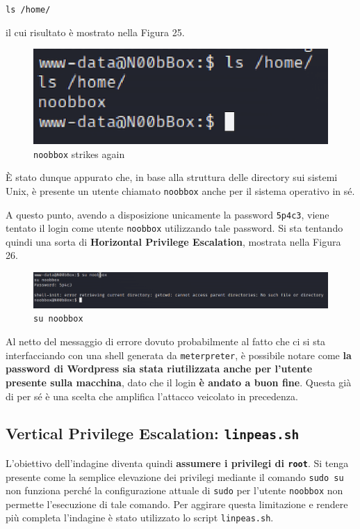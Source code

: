 \documentclass[a4paper, 12pt, oneside]{article}
\begin{document}
\begin{center}
    \texttt{ls /home/}
\end{center}

il cui risultato è mostrato nella Figura 25.

\begin{figure}[h!]
    \centering
    \includegraphics[width=\textwidth]{img/ls-home.png}
    \caption{\texttt{noobbox} strikes again}
\end{figure}

È stato dunque appurato che, in base alla struttura delle directory sui sistemi Unix, è presente un utente chiamato \texttt{noobbox} anche per il sistema operativo in sé.

A questo punto, avendo a disposizione unicamente la password \texttt{5p4c3}, viene tentato il login come utente \texttt{noobbox} utilizzando tale password. Si sta tentando quindi una sorta di \textbf{Horizontal Privilege Escalation}, mostrata nella Figura 26.

\begin{figure}[h!]
    \centering
    \includegraphics[width=\textwidth]{img/su-noobbox.png}
    \caption{\texttt{su noobbox}}
\end{figure}

\newpage
Al netto del messaggio di errore dovuto probabilmente al fatto che ci si sta interfacciando con una shell generata da \texttt{meterpreter}, è possibile notare come \textbf{la password di Wordpress sia stata riutilizzata anche per l'utente presente sulla macchina}, dato che il login \textbf{è andato a buon fine}. Questa già di per sé è una scelta che amplifica l'attacco veicolato in precedenza.

\subsection{Vertical Privilege Escalation: \texttt{linpeas.sh}}
L'obiettivo dell'indagine diventa quindi \textbf{assumere i privilegi di \texttt{root}}. Si tenga presente come la semplice elevazione dei privilegi mediante il comando \texttt{sudo su} non funziona perché la configurazione attuale di \texttt{sudo} per l'utente \texttt{noobbox} non permette l'esecuzione di tale comando. Per aggirare questa limitazione e rendere più completa l'indagine è stato utilizzato lo script \texttt{linpeas.sh}.
\end{document}

